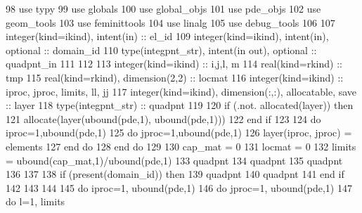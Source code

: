 \begin{DoxyCode}
98       \textcolor{keywordtype}{use }typy
99       \textcolor{keywordtype}{use }globals
100       \textcolor{keywordtype}{use }global_objs
101       \textcolor{keywordtype}{use }pde_objs
102       \textcolor{keywordtype}{use }geom_tools
103       \textcolor{keywordtype}{use }feminittools
104       \textcolor{keywordtype}{use }linalg
105       \textcolor{keywordtype}{use }debug_tools
106 
107       \textcolor{keywordtype}{integer(kind=ikind)}, \textcolor{keywordtype}{intent(in)} :: el\_id
109       \textcolor{keywordtype}{integer(kind=ikind)}, \textcolor{keywordtype}{intent(in)}, \textcolor{keywordtype}{optional} :: domain\_id
110       \textcolor{keywordtype}{type}(integpnt_str), \textcolor{keywordtype}{intent(in out)}, \textcolor{keywordtype}{optional} :: quadpnt\_in
111       
112       
113       \textcolor{keywordtype}{integer(kind=ikind)} :: i,j,l, m
114       \textcolor{keywordtype}{real(kind=rkind)} :: tmp
115       \textcolor{keywordtype}{real(kind=rkind)}, \textcolor{keywordtype}{dimension(2,2)} :: locmat
116       \textcolor{keywordtype}{integer(kind=ikind)} :: iproc, jproc, limits, ll, jj
117       \textcolor{keywordtype}{integer(kind=ikind)}, \textcolor{keywordtype}{dimension(:,:)}, \textcolor{keywordtype}{allocatable}, \textcolor{keywordtype}{save} :: layer
118       \textcolor{keywordtype}{type}(integpnt_str) :: quadpnt
119 
120       \textcolor{keywordflow}{if} (.not. \textcolor{keyword}{allocated}(layer)) \textcolor{keywordflow}{then}
121         \textcolor{keyword}{allocate}(layer(ubound(pde,1), ubound(pde,1)))
122 \textcolor{keywordflow}{      end if}
123 
124       \textcolor{keywordflow}{do} iproc=1,ubound(pde,1)
125         \textcolor{keywordflow}{do} jproc=1,ubound(pde,1)
126             layer(iproc, jproc) = elements%
127 \textcolor{keywordflow}{        end do}
128 \textcolor{keywordflow}{      end do}
129 
130       cap_mat = 0
131       locmat = 0
132       limits = ubound(cap_mat,1)/ubound(pde,1)     
133       quadpnt%
134       quadpnt%
135       quadpnt%
136       
137       
138       \textcolor{keywordflow}{if} (\textcolor{keyword}{present}(domain\_id)) \textcolor{keywordflow}{then}
139         quadpnt%
140         quadpnt%
141 \textcolor{keywordflow}{      end if}
142 
143 
144 
145       \textcolor{keywordflow}{do} iproc=1, ubound(pde,1)
146         \textcolor{keywordflow}{do} jproc=1, ubound(pde,1)
147           \textcolor{keywordflow}{do} l=1,  limits

\end{DoxyCode}
